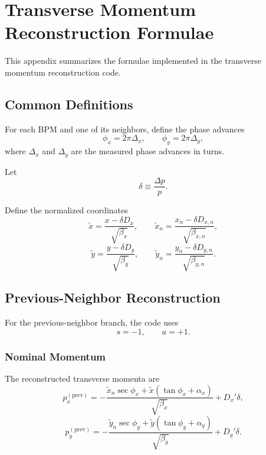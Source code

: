 \appendix
\section{Transverse Momentum Reconstruction Formulae}
\label{app:tmom_recon}

This appendix summarizes the formulae implemented in the transverse momentum
reconstruction code.

\subsection{Common Definitions}

For each BPM and one of its neighbors, define the phase advances
\begin{equation}
\phi_x = 2\pi \Delta_x,
\qquad
\phi_y = 2\pi \Delta_y,
\end{equation}
where $\Delta_x$ and $\Delta_y$ are the measured phase advances in turns.

Let
\begin{equation}
\delta \equiv \frac{\Delta p}{p}.
\end{equation}

Define the normalized coordinates
\begin{equation}
\tilde x = \frac{x - \delta D_x}{\sqrt{\beta_x}},
\qquad
\tilde x_n = \frac{x_n - \delta D_{x,n}}{\sqrt{\beta_{x,n}}},
\end{equation}
\begin{equation}
\tilde y = \frac{y - \delta D_y}{\sqrt{\beta_y}},
\qquad
\tilde y_n = \frac{y_n - \delta D_{y,n}}{\sqrt{\beta_{y,n}}}.
\end{equation}

\subsection{Previous-Neighbor Reconstruction}

For the previous-neighbor branch, the code uses
\begin{equation}
s = -1,
\qquad
a = +1.
\end{equation}

\subsubsection{Nominal Momentum}

The reconstructed transverse momenta are
\begin{equation}
p_x^{(\mathrm{prev})}
=
- \frac{\tilde x_n \sec\phi_x + \tilde x\left(\tan\phi_x + \alpha_x\right)}
{\sqrt{\beta_x}}
+ D_x' \delta,
\end{equation}
\begin{equation}
p_y^{(\mathrm{prev})}
=
- \frac{\tilde y_n \sec\phi_y + \tilde y\left(\tan\phi_y + \alpha_y\right)}
{\sqrt{\beta_y}}
+ D_y' \delta.
\end{equation}

